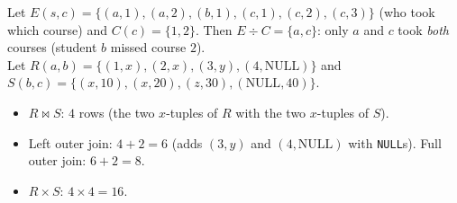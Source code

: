 \documentclass[11pt,a4paper]{article}
\begin{document}
\begin{example}
Let $E(s,c)=\{(a,1),(a,2),(b,1),(c,1),(c,2),(c,3)\}$ (who took which course) and $C(c)=\{1,2\}$. Then $E\div C=\{a,c\}$: only $a$ and $c$ took \emph{both} courses (student $b$ missed course $2$).\\[4pt]
Let $R(a,b)=\{(1,x),(2,x),(3,y),(4,\text{NULL})\}$ and $S(b,c)=\{(x,10),(x,20),(z,30),(\text{NULL},40)\}$.
\begin{itemize}[noitemsep]
\item $R\bowtie S$: $4$ rows (the two $x$-tuples of $R$ with the two $x$-tuples of $S$).
\item Left outer join: $4+2=6$ (adds $(3,y)$ and $(4,\text{NULL})$ with \texttt{NULL}s). Full outer join: $6+2=8$.
\item $R\times S$: $4\times4=16$.
\end{itemize}
\end{example}
\end{document}
